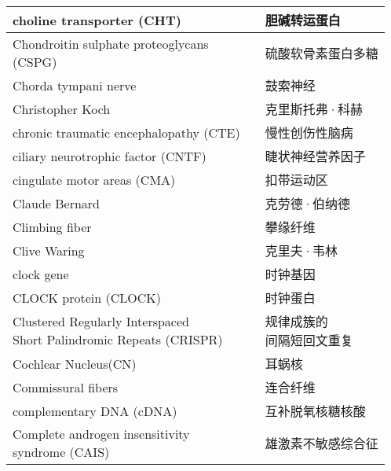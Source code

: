 \begin{longtable}{lll}
	\midrule
	choline transporter (CHT)   && 胆碱转运蛋白  \\
	
	\midrule
	\makecell{Chondroitin sulphate proteoglycans \\(CSPG)} && 硫酸软骨素蛋白多糖  \\
	
	\midrule
	Chorda tympani nerve   && 鼓索神经  \\
	
	\midrule
	Christopher Koch   && 克里斯托弗·科赫  \\
	
	\midrule
	chronic traumatic encephalopathy (CTE)   && 慢性创伤性脑病  \\
	
	\midrule
	ciliary neurotrophic factor (CNTF)  && 睫状神经营养因子  \\
	
	\midrule
	cingulate motor areas (CMA)   && 扣带运动区  \\
	
	\midrule
	Claude Bernard   && 克劳德·伯纳德  \\
	
	\midrule
	Climbing fiber   && 攀缘纤维  \\
	
	\midrule
	Clive Waring   && 克里夫·韦林  \\
	
	\midrule
	clock gene   && 时钟基因  \\
	
	\midrule
	CLOCK protein (CLOCK)  && 时钟蛋白  \\
	
	\midrule
	\makecell{Clustered Regularly Interspaced\\ Short Palindromic Repeats (CRISPR)}  && \makecell{规律成簇的\\间隔短回文重复}  \\
	
	\midrule
	Cochlear Nucleus(CN)   && 耳蜗核  \\
	
	\midrule
	Commissural fibers   && 连合纤维  \\
	
	\midrule
	complementary DNA (cDNA)   && 互补脱氧核糖核酸  \\
	
	\midrule
	\makecell{Complete androgen insensitivity\\ syndrome (CAIS)}  && 雄激素不敏感综合征  \\
	

\end{longtable}

